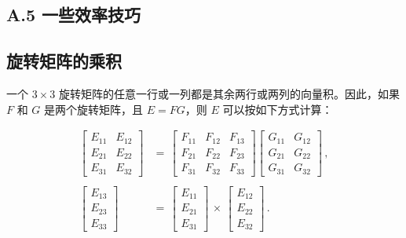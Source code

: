 \documentclass[10pt,a4paper]{book}
\theoremstyle{thmstyle} %
\theoremstyle{defstyle} %
\theoremstyle{prostyle} %
\begin{document}
\subsection{A.5 一些效率技巧}





\subsection{旋转矩阵的乘积}





一个 $3 \times 3$ 旋转矩阵的任意一行或一列都是其余两行或两列的向量积。因此，如果 $F$ 和 $G$ 是两个旋转矩阵，且 $E = F G$，则 $E$ 可以按如下方式计算：



$$
\begin{array}{rl} { \left[ \begin{array}{lll} { E _ { 11 } } & { E _ { 12 } } \\{ E _ { 21 } } & { E _ { 22 } } \\{ E _ { 31 } } & { E _ { 32 } } \end{array} \right] } & { = \, \left[ \begin{array}{lll} { F _ { 11 } } & { F _ { 12 } } & { F _ { 13 } } \\{ F _ { 21 } } & { F _ { 22 } } & { F _ { 23 } } \\{ F _ { 31 } } & { F _ { 32 } } & { F _ { 33 } } \end{array} \right] \left[ \begin{array}{ll} { G _ { 11 } } & { G _ { 12 } } \\{ G _ { 21 } } & { G _ { 22 } } \\{ G _ { 31 } } & { G _ { 32 } } \end{array} \right] \, , } \\& { } \\{ \left[ \begin{array}{l} { E _ { 13 } } \\{ E _ { 23 } } \\{ E _ { 33 } } \end{array} \right] } & { = \, \left[ \begin{array}{l} { E _ { 11 } } \\{ E _ { 21 } } \\{ E _ { 31 } } \end{array} \right] \, \times \, \left[ \begin{array}{l} { E _ { 12 } } \\{ E _ { 22 } } \\{ E _ { 32 } } \end{array} \right] \, . } \end{array}
$$
\end{document}
